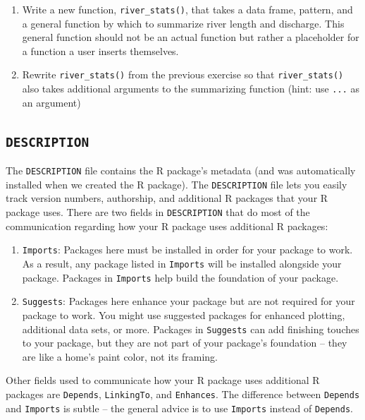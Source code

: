\documentclass[
]{book}
\begin{document}
\begin{enumerate}
\def\labelenumi{\arabic{enumi}.}
\item
  Write a new function, \texttt{river\_stats()}, that takes a data frame, pattern, and a general function by which to summarize river length and discharge. This general function should not be an actual function but rather a placeholder for a function a user inserts themselves.
\item
  Rewrite \texttt{river\_stats()} from the previous exercise so that \texttt{river\_stats()} also takes additional arguments to the summarizing function (hint: use \texttt{...} as an argument)
\end{enumerate}

\hypertarget{description}{%
\subsection{\texorpdfstring{\texttt{DESCRIPTION}}{DESCRIPTION}}\label{description}}

The \texttt{DESCRIPTION} file contains the R package's metadata (and was automatically installed when we created the R package). The \texttt{DESCRIPTION} file lets you easily track version numbers, authorship, and additional R packages that your R package uses. There are two fields in \texttt{DESCRIPTION} that do most of the communication regarding how your R package uses additional R packages:

\begin{enumerate}
\def\labelenumi{\arabic{enumi}.}
\item
  \texttt{Imports}: Packages here must be installed in order for your package to work. As a result, any package listed in \texttt{Imports} will be installed alongside your package. Packages in \texttt{Imports} help build the foundation of your package.
\item
  \texttt{Suggests}: Packages here enhance your package but are not required for your package to work. You might use suggested packages for enhanced plotting, additional data sets, or more. Packages in \texttt{Suggests} can add finishing touches to your package, but they are not part of your package's foundation -- they are like a home's paint color, not its framing.
\end{enumerate}

Other fields used to communicate how your R package uses additional R packages are \texttt{Depends}, \texttt{LinkingTo}, and \texttt{Enhances}. The difference between \texttt{Depends} and \texttt{Imports} is subtle -- the general advice is to use \texttt{Imports} instead of \texttt{Depends}.
\end{document}
